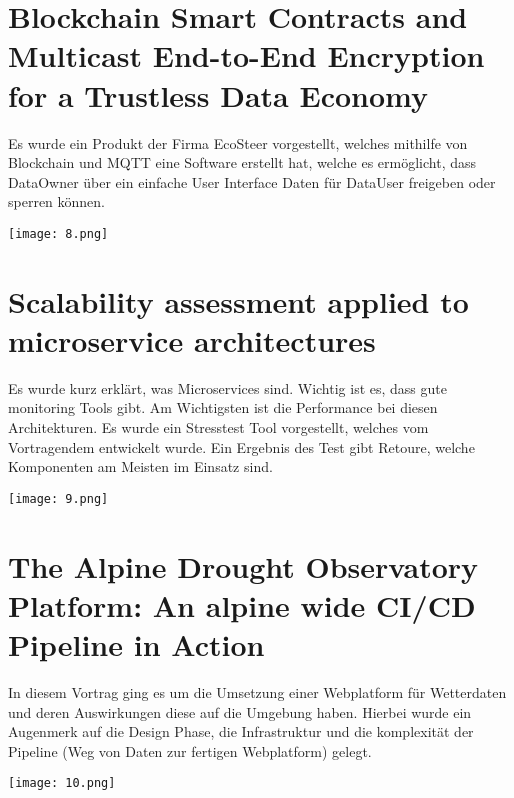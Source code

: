\documentclass[10pt,ngerman]{scrartcl}
\begin{document}
\section*{Blockchain Smart Contracts and Multicast End-to-End Encryption for a Trustless Data Economy}
\begin{minipage}[b]{0.65\linewidth}
Es wurde ein Produkt der Firma EcoSteer vorgestellt, welches mithilfe von Blockchain und MQTT eine Software erstellt hat, welche es ermöglicht, dass DataOwner über ein einfache User Interface Daten für DataUser freigeben oder sperren können.
\end{minipage}
\hfill
\begin{minipage}[b]{0.35\linewidth}
\begin{flushright}
\texttt{[image: 8.png]}
\end{flushright}
\end{minipage}

\section*{Scalability assessment applied to microservice architectures}
\begin{minipage}[b]{0.65\linewidth}
Es wurde kurz erklärt, was Microservices sind. Wichtig ist es, dass gute monitoring Tools gibt. Am Wichtigsten ist die Performance bei diesen Architekturen. Es wurde ein Stresstest Tool vorgestellt, welches vom Vortragendem entwickelt wurde. Ein Ergebnis des Test gibt Retoure, welche Komponenten am Meisten im Einsatz sind.
\end{minipage}
\hfill
\begin{minipage}[b]{0.35\linewidth}
\begin{flushright}
\texttt{[image: 9.png]}
\end{flushright}
\end{minipage}

\section*{The Alpine Drought Observatory Platform: An alpine wide CI/CD Pipeline in Action}
\begin{minipage}[b]{0.65\linewidth}
In diesem Vortrag ging es um die Umsetzung einer Webplatform für Wetterdaten und deren Auswirkungen diese auf die Umgebung haben. Hierbei wurde ein Augenmerk auf die Design Phase, die Infrastruktur und die komplexität der Pipeline (Weg von Daten zur fertigen Webplatform) gelegt.
\end{minipage}
\hfill
\begin{minipage}[b]{0.35\linewidth}
\begin{flushright}
\texttt{[image: 10.png]}
\end{flushright}
\end{minipage}
\end{document}
